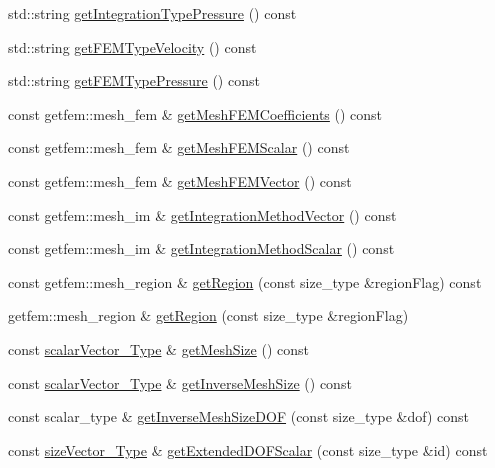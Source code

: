 \begin{DoxyCompactItemize}
\item 
std\-::string \hyperlink{classMeshHandler_a7e8638201a709e36dafa14998b2ba763}{get\-Integration\-Type\-Pressure} () const 
\item 
std\-::string \hyperlink{classMeshHandler_a79d87d2c1b1d01e942efe2678025c4a3}{get\-F\-E\-M\-Type\-Velocity} () const 
\item 
std\-::string \hyperlink{classMeshHandler_a007db33b8b43e68e059f1f989c0f79fa}{get\-F\-E\-M\-Type\-Pressure} () const 
\item 
const getfem\-::mesh\-\_\-fem \& \hyperlink{classMeshHandler_a44953dabfaec9e6577f21c023f792b61}{get\-Mesh\-F\-E\-M\-Coefficients} () const 
\item 
const getfem\-::mesh\-\_\-fem \& \hyperlink{classMeshHandler_aeedf6a1246d39207a92fc0a5ddbd439f}{get\-Mesh\-F\-E\-M\-Scalar} () const 
\item 
const getfem\-::mesh\-\_\-fem \& \hyperlink{classMeshHandler_a786a00ddf3a26b923a07b942ea2b2247}{get\-Mesh\-F\-E\-M\-Vector} () const 
\item 
const getfem\-::mesh\-\_\-im \& \hyperlink{classMeshHandler_afd0fbe553d40c2f0dd42e36410bae3a7}{get\-Integration\-Method\-Vector} () const 
\item 
const getfem\-::mesh\-\_\-im \& \hyperlink{classMeshHandler_a0a25e658aff6ff2f1c06f04b847b792d}{get\-Integration\-Method\-Scalar} () const 
\item 
const getfem\-::mesh\-\_\-region \& \hyperlink{classMeshHandler_adfb74826f08fd62a92200ebfe8ce3fbe}{get\-Region} (const size\-\_\-type \&region\-Flag) const 
\item 
getfem\-::mesh\-\_\-region \& \hyperlink{classMeshHandler_a36ba76b0940684abab86ef6e56fe1086}{get\-Region} (const size\-\_\-type \&region\-Flag)
\item 
const \hyperlink{Core_8h_a4e75b5863535ba1dd79942de2846eff0}{scalar\-Vector\-\_\-\-Type} \& \hyperlink{classMeshHandler_ae176155967a168d4342ee9dfb72689e5}{get\-Mesh\-Size} () const 
\item 
const \hyperlink{Core_8h_a4e75b5863535ba1dd79942de2846eff0}{scalar\-Vector\-\_\-\-Type} \& \hyperlink{classMeshHandler_a05fa48c67a3fde6594fa3721785b9ce6}{get\-Inverse\-Mesh\-Size} () const 
\item 
const scalar\-\_\-type \& \hyperlink{classMeshHandler_a36f6694bfd1a75bfb0a2a7c6ec69500f}{get\-Inverse\-Mesh\-Size\-D\-O\-F} (const size\-\_\-type \&dof) const 
\item 
const \hyperlink{Core_8h_a83c51913d041a5001e8683434c09857f}{size\-Vector\-\_\-\-Type} \& \hyperlink{classMeshHandler_a293bf3ce9492a84f4b510327bdb11939}{get\-Extended\-D\-O\-F\-Scalar} (const size\-\_\-type \&id) const 

\end{DoxyCompactItemize}
